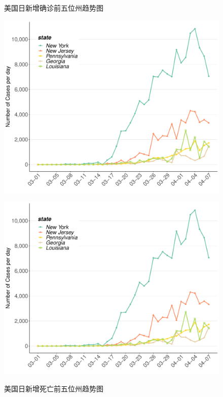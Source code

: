\documentclass[
]{article}
\begin{document}
\begin{figure}[H]
\centering
\begin{minipage}[b]{0.45\linewidth}
\caption{美国日新增确诊前五位州趋势图}
\includegraphics[]{./input/covid5.pdf}
\label{}
\end{minipage}
\quad
\begin{minipage}[b]{0.45\linewidth}
\caption{美国日新增死亡前五位州趋势图}
\includegraphics[]{./input/covid5.pdf}
\label{}
\end{minipage}
\end{figure}
\end{document}
